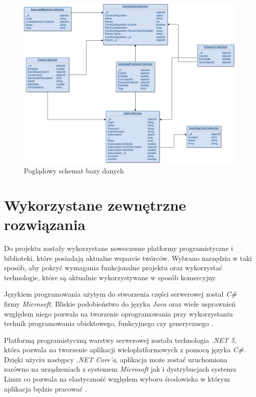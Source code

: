 \documentclass[a4paper,twoside,12pt]{book}
\begin{document}
\begin{figure}[H]
	\centering
	\includegraphics[width=1\linewidth]{../diagramy/schemat_bazy}
	\caption{Poglądowy schemat bazy danych}
	\label{fig:schematbazy}
\end{figure}

\section{Wykorzystane zewnętrzne rozwiązania}
Do projektu zostały wykorzystane nowoczesne platformy programistyczne i biblioteki, które posiadają aktualne wsparcie twórców. Wybrano narzędzia w taki sposób, aby pokryć wymagania funkcjonalne projektu oraz wykorzystać technologie, które są aktualnie wykorzystywane w sposób komercyjny.

Językiem programowania użytym do stworzenia części serwerowej został \textit{C\#} firmy \textit{Microsoft}. Bliskie podobieństwo do języka \textit{Java} oraz wiele usprawnień względem niego pozwala na tworzenie oprogramowania przy wykorzystaniu technik programowania obiektowego, funkcyjnego czy generycznego \cite{bib:csharp}.

Platformą programistyczną warstwy serwerowej została technologia \textit{.NET 5}, która pozwala na tworzenie aplikacji wieloplatformowych z pomocą języka \textit{C\#}. Dzięki użyciu następcy \textit{.NET Core'a}, aplikacja może zostać uruchomiona zarówno na urządzeniach z systemem \textit{Microsoft} jak i dystrybucjach systemu Linux co pozwala na elastyczność względem wyboru środowiska w którym aplikacja będzie pracować \cite{bib:dotnet5introduction}.
\end{document}

